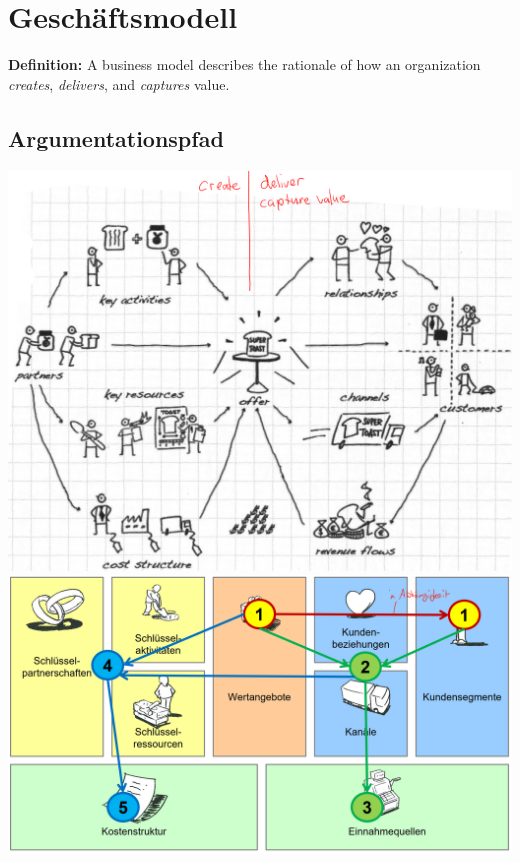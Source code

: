 \section{Geschäftsmodell}
\textbf{Definition:} A business model describes the rationale of how an organization \textit{creates}, \textit{delivers}, and \textit{captures} value. 

\subsection{Argumentationspfad}
\begin{multicols}{2}
	\includegraphics[width=1\linewidth]{images/Geschaeftsmodell}
	\includegraphics[width=1\linewidth]{images/Argumentationspfad}
\end{multicols}

